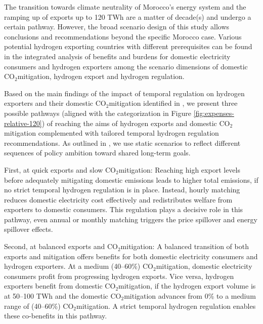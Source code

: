 \documentclass[5p,numafflabel]{elsarticle}
\newcommand{\co}{\ce{CO2}~}
\def\co{CO${}_2${\:}}
\begin{document}
The transition towards climate neutrality of Morocco's energy system and the ramping up of exports up to 120 TWh are a matter of decade(s) and undergo a certain pathway. 
However, the broad scenario design of this study allows conclusions and recommendations beyond the specific Morocco case.
Various potential hydrogen exporting countries with different prerequisites can be found in the integrated analysis of benefits and burdens for domestic electricity consumers and hydrogen exporters among the scenario dimensions of domestic \co mitigation, hydrogen export and hydrogen regulation.

Based on the main findings of the impact of temporal regulation on hydrogen exporters and their domestic \co mitigation identified in , we present three possible pathways (aligned with the categorization in Figure \ref{fig:expenses-relative-120}) of reaching the aims of hydrogen exports and domestic \co mitigation complemented with tailored temporal hydrogen regulation recommendations.
As outlined in , we use static scenarios to reflect different sequences of policy ambition toward shared long-term goals.

First, at quick exports and slow \co mitigation: Reaching high export levels before adequately mitigating domestic emissions leads to higher total emissions, if no strict temporal hydrogen regulation is in place. Instead, hourly matching reduces domestic electricity cost effectively and redistributes welfare from exporters to domestic consumers. This regulation plays a decisive role in this pathway, even annual or monthly matching triggers the price spillover and energy spillover effects.

Second, at balanced exports and \co mitigation: A balanced transition of both exports and mitigation offers benefits for both domestic electricity consumers and hydrogen exporters. At a medium (40--60\%) \co mitigation, domestic electricity consumers profit from progressing hydrogen exports. Vice versa, hydrogen exporters benefit from domestic \co mitigation, if the hydrogen export volume is at 50--100 TWh and the domestic \co mitigation advances from 0\% to a medium range of (40--60\%) \co mitigation. A strict temporal hydrogen regulation enables these co-benefits in this pathway.
\end{document}
